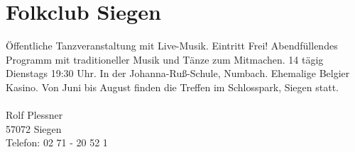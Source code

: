 \section{Folkclub Siegen} 
Öffentliche Tanzveranstaltung mit Live-Musik. Eintritt Frei! Abendfüllendes Programm mit traditioneller Musik und Tänze zum Mitmachen. 14 tägig Dienstags 19:30 Uhr. In der Johanna-Ruß-Schule, Numbach. Ehemalige Belgier Kasino. Von Juni bis August finden die Treffen im Schlosspark, Siegen statt. \\
\\
Rolf Plessner\\
57072 Siegen\\
Telefon: 02 71 - 20 52 1 